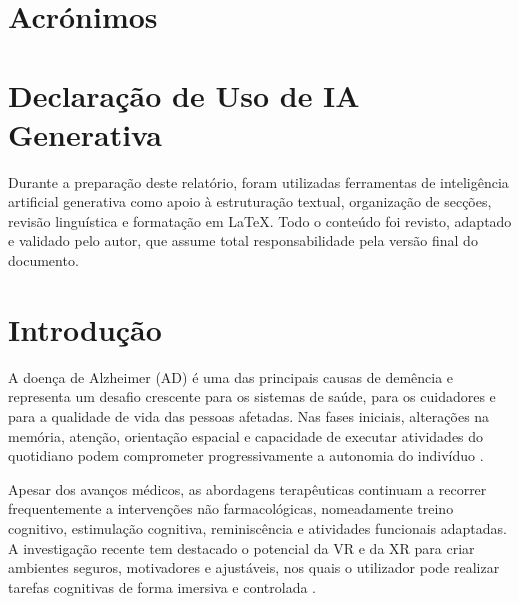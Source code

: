 \documentclass[12pt,a4paper,oneside]{report}
\newcommand{\blankpage}{
    \clearpage
    \thispagestyle{empty}
    \null
    \clearpage
}
\begin{document}
\listoftables

\blankpage

\chapter*{Acrónimos}
\begin{acronym}[XRI]
\end{acronym}

\blankpage

\chapter*{Declaração de Uso de IA Generativa}

Durante a preparação deste relatório, foram utilizadas ferramentas de inteligência artificial generativa como apoio à estruturação textual, organização de secções, revisão linguística e formatação em \LaTeX. Todo o conteúdo foi revisto, adaptado e validado pelo autor, que assume total responsabilidade pela versão final do documento.

\blankpage

\clearpage
{}

\chapter{Introdução}

A doença de Alzheimer (\ac{AD}) é uma das principais causas de demência e representa um desafio crescente para os sistemas de saúde, para os cuidadores e para a qualidade de vida das pessoas afetadas. Nas fases iniciais, alterações na memória, atenção, orientação espacial e capacidade de executar atividades do quotidiano podem comprometer progressivamente a autonomia do indivíduo \cite{vasquez2025,oliveira2021}.

Apesar dos avanços médicos, as abordagens terapêuticas continuam a recorrer frequentemente a intervenções não farmacológicas, nomeadamente treino cognitivo, estimulação cognitiva, reminiscência e atividades funcionais adaptadas. A investigação recente tem destacado o potencial da \ac{VR} e da \ac{XR} para criar ambientes seguros, motivadores e ajustáveis, nos quais o utilizador pode realizar tarefas cognitivas de forma imersiva e controlada \cite{vasquez2025,goncalves2025}.
\end{document}
